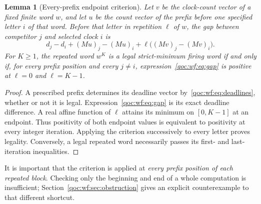 \documentclass[11pt,letterpaper]{article}
\newtheorem{lemma}[theorem]{Lemma}
\theoremstyle{definition}
\theoremstyle{remark}
\begin{document}
\begin{lemma}[Every-prefix endpoint criterion]\label{qoc:wf:lem:endpoint}
Let $v$ be the clock-count vector of a fixed finite word $w$, and let $u$ be the count vector of the prefix before one specified letter $i$ of that word. Before that letter in repetition $\ell$ of $w$, the gap between competitor $j$ and selected clock $i$ is
\begin{equation}\label{qoc:wf:eq:gap}
 d_j-d_i+(Mu)_j-(Mu)_i
   +\ell\big((Mv)_j-(Mv)_i\big).
\end{equation}
For $K\ge1$, the repeated word $w^K$ is a legal strict-minimum firing word if and only if, for every prefix position and every $j\ne i$, expression~\eqref{qoc:wf:eq:gap} is positive at $\ell=0$ and $\ell=K-1$.
\end{lemma}
\begin{proof}
A prescribed prefix determines its deadline vector by~\eqref{qoc:wf:eq:deadlines}, whether or not it is legal. Expression~\eqref{qoc:wf:eq:gap} is its exact deadline difference. A real affine function of $\ell$ attains its minimum on $[0,K-1]$ at an endpoint. Thus positivity of both endpoint values is equivalent to positivity at every integer iteration. Applying the criterion successively to every letter proves legality. Conversely, a legal repeated word necessarily passes its first- and last-iteration inequalities.
\end{proof}

It is important that the criterion is applied at \emph{every prefix position of each repeated block}. Checking only the beginning and end of a whole computation is insufficient; Section~\ref{qoc:wf:sec:obstruction} gives an explicit counterexample to that different shortcut.
\end{document}

